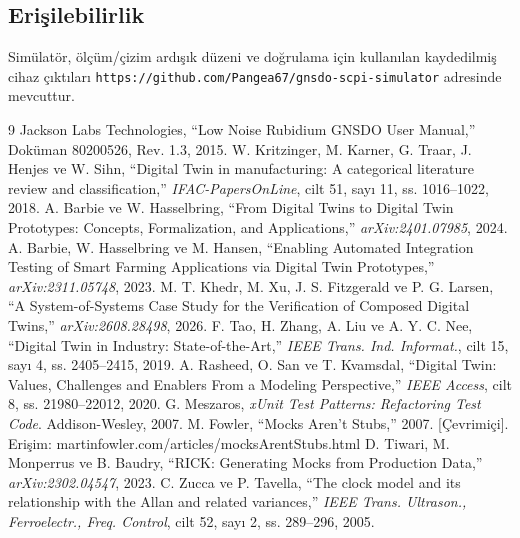 \documentclass[9pt,twocolumn,a4paper]{extarticle}
\begin{document}
\subsection*{Erişilebilirlik}
Simülatör, ölçüm/çizim ardışık düzeni ve doğrulama için kullanılan kaydedilmiş cihaz çıktıları
\texttt{https://github.com/Pangea67/gnsdo-scpi-simulator} adresinde mevcuttur.


\begin{thebibliography}{9}
\footnotesize
\setlength{\itemsep}{-2pt}
\setlength{\parskip}{0pt}
 Jackson Labs Technologies, ``Low Noise Rubidium GNSDO User Manual,'' Doküman 80200526, Rev. 1.3, 2015.
 W. Kritzinger, M. Karner, G. Traar, J. Henjes ve W. Sihn, ``Digital Twin in manufacturing: A categorical literature review and classification,'' \textit{IFAC-PapersOnLine}, cilt 51, sayı 11, ss. 1016--1022, 2018.
 A. Barbie ve W. Hasselbring, ``From Digital Twins to Digital Twin Prototypes: Concepts, Formalization, and Applications,'' \textit{arXiv:2401.07985}, 2024.
 A. Barbie, W. Hasselbring ve M. Hansen, ``Enabling Automated Integration Testing of Smart Farming Applications via Digital Twin Prototypes,'' \textit{arXiv:2311.05748}, 2023.
 M. T. Khedr, M. Xu, J. S. Fitzgerald ve P. G. Larsen, ``A System-of-Systems Case Study for the Verification of Composed Digital Twins,'' \textit{arXiv:2608.28498}, 2026.
 F. Tao, H. Zhang, A. Liu ve A. Y. C. Nee, ``Digital Twin in Industry: State-of-the-Art,'' \textit{IEEE Trans. Ind. Informat.}, cilt 15, sayı 4, ss. 2405--2415, 2019.
 A. Rasheed, O. San ve T. Kvamsdal, ``Digital Twin: Values, Challenges and Enablers From a Modeling Perspective,'' \textit{IEEE Access}, cilt 8, ss. 21980--22012, 2020.
 G. Meszaros, \textit{xUnit Test Patterns: Refactoring Test Code}. Addison-Wesley, 2007.
 M. Fowler, ``Mocks Aren't Stubs,'' 2007. [Çevrimiçi]. Erişim: martinfowler.com/articles/mocksArentStubs.html
 D. Tiwari, M. Monperrus ve B. Baudry, ``RICK: Generating Mocks from Production Data,'' \textit{arXiv:2302.04547}, 2023.
 C. Zucca ve P. Tavella, ``The clock model and its relationship with the Allan and related variances,'' \textit{IEEE Trans. Ultrason., Ferroelectr., Freq. Control}, cilt 52, sayı 2, ss. 289--296, 2005.
\end{thebibliography}
\end{document}
